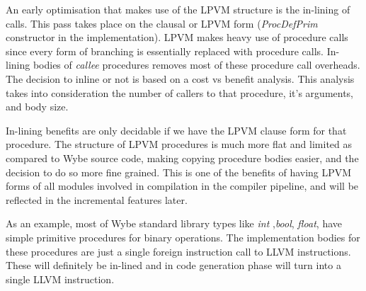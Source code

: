 An early optimisation that makes use of the LPVM structure is the in-lining of
calls. This pass takes place on the clausal or LPVM form (\textit{ProcDefPrim}
constructor in the implementation). LPVM makes heavy use of procedure calls
since every form of branching is essentially replaced with procedure
calls. In-lining bodies of \textit{callee} procedures removes most of these
procedure call overheads. The decision to inline or not is based on a cost vs
benefit analysis. This analysis takes into consideration the number of callers
to that procedure, it's arguments, and body size. 

In-lining benefits are only decidable if we have the LPVM clause form for that
procedure. The structure of LPVM procedures is much more flat and limited as
compared to Wybe source code, making copying procedure bodies easier, and the
decision to do so more fine grained. This is one of the benefits of having LPVM
forms of all modules involved in compilation in the compiler pipeline, and will
be reflected in the incremental features later.

As an example, most of Wybe standard library types like \textit{int}
,\textit{bool}, \textit{float}, have simple primitive procedures for binary
operations. The implementation bodies for these procedures are just a single
foreign instruction call to LLVM instructions. These will definitely be
in-lined and in code generation phase will turn into a single LLVM instruction.
